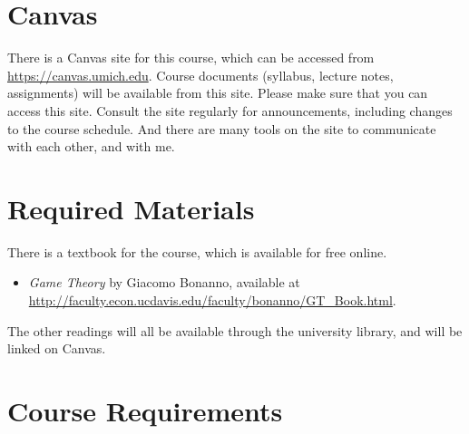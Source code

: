 \documentclass[
  12pt,
  letterpaper,
  DIV=11,
  numbers=noendperiod]{scrartcl}
\providecommand{\tightlist}{%
  \setlength{\itemsep}{0pt}\setlength{\parskip}{0pt}}\usepackage{longtable,booktabs,array}
\begin{document}
\section{Canvas}\label{canvas}

There is a Canvas site for this course, which can be accessed from
\url{https://canvas.umich.edu}. Course documents (syllabus, lecture
notes, assignments) will be available from this site. Please make sure
that you can access this site. Consult the site regularly for
announcements, including changes to the course schedule. And there are
many tools on the site to communicate with each other, and with me.

\section{Required Materials}\label{required-materials}

There is a textbook for the course, which is available for free online.

\begin{itemize}
\tightlist
\item
  \emph{Game Theory} by Giacomo Bonanno, available at
  \url{http://faculty.econ.ucdavis.edu/faculty/bonanno/GT_Book.html}.
\end{itemize}

The other readings will all be available through the university library,
and will be linked on Canvas.

\section{Course Requirements}\label{course-requirements}
\end{document}
